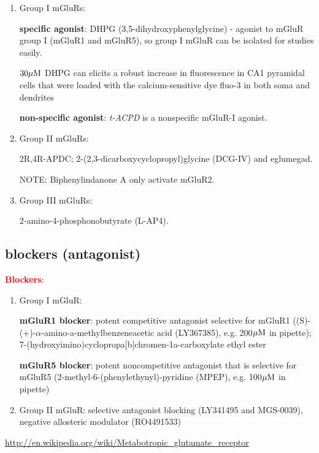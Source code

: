\begin{enumerate}

  \item Group I mGluRs:
  
{\bf specific agonist}: DHPG (3,5-dihydroxyphenylglycine) - agonist to mGluR
group I (mGluR1 and mGluR5), so group I mGluR can be isolated for studies easily.

$30{\mu\text{M}}$ DHPG can elicits a robust increase in fluorescence in CA1 pyramidal cells
that were loaded with the calcium-sensitive dye fluo-3 in both soma and
dendrites \citep{mannaioni2001}

{\bf non-specific agonist}: {\it t-ACPD} is a nonspecific mGluR-I agonist.

  
  \item Group II mGluRs:
  
2R,4R-APDC; 2-(2,3-dicarboxycyclopropyl)glycine (DCG-IV) and eglumegad.
  
NOTE: Biphenylindanone A only activate mGluR2.
  
  \item Group III mGluRs:
  
2-amino-4-phosphonobutyrate (L-AP4).

\end{enumerate}


\subsection{blockers (antagonist)}
\label{sec:mGluR_group-1-antagonist}

\textcolor{red}{\bf Blockers}:
\begin{enumerate}
  
  \item Group I mGluR: 
  
  {\bf mGluR1 blocker}: potent competitive antagonist selective for mGluR1
  ((S)-(+)-$\alpha$-amino-a-methylbenzeneacetic acid (LY367385), e.g.
  200${\mu\text{M}}$ in pipette);  7-(hydroxyimino)cyclopropa[b]chromen-1a-carboxylate
  ethyl ester
  
  
  {\bf mGluR5 blocker}: potent noncompetitive antagonist that is selective for
  mGluR5 (2-methyl-6-(phenylethynyl)-pyridine (MPEP), e.g. 100${\mu\text{M}}$ in pipette)
  
  \item Group II mGluR:  selective antagonist blocking (LY341495 and
  MGS-0039),   negative allosteric modulator (RO4491533)

\end{enumerate}
\url{http://en.wikipedia.org/wiki/Metabotropic_glutamate_receptor}

